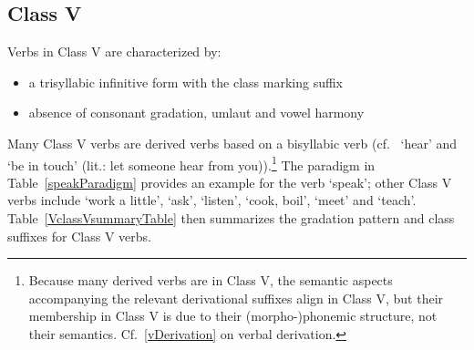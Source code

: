 
\subsection{Class V}\label{VclassV}
Verbs in Class V are characterized by: 
\begin{itemize}
\item{a trisyllabic infinitive form with the class marking suffix }
\item{absence of consonant gradation, umlaut and vowel harmony} 
\end{itemize}
Many Class V verbs are derived verbs based on a bisyllabic verb (cf.~ ‘hear’ and  ‘be in touch’ (lit.: let someone hear from you)).\footnote{Because many derived verbs are in Class V, the semantic aspects accompanying the relevant derivational suffixes align in Class V, but their membership in Class V is due to their \mbox{(morpho-)phonemic} structure, not their semantics. Cf.~\SEC\ref{vDerivation} on verbal derivation.} 
The paradigm in Table~\vref{speakParadigm} provides an example for the verb  ‘speak’; 
other Class V verbs include  ‘work a little’,  ‘ask’,  ‘listen’,  ‘cook, boil’,  ‘meet’ and  ‘teach’. 
Table~\ref{VclassVsummaryTable} then summarizes the gradation pattern and class suffixes for Class V verbs. %
